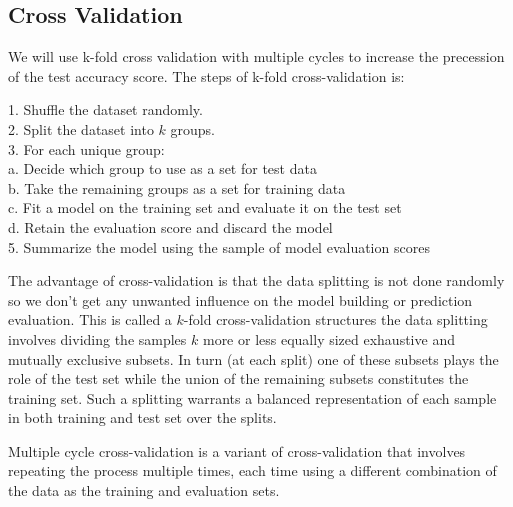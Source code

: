 \subsection{Cross Validation}
We will use k-fold cross validation with multiple cycles to increase the
precession of the test accuracy score. 
The steps of k-fold cross-validation is:
\begin{mdframed}[backgroundcolor=black!10]
\raggedright

1. Shuffle the dataset randomly.\\

2. Split the dataset into $k$ groups.\\

3. For each unique group:\\

\hspace{1cm}a. Decide which group to use as a set for test data\\

\hspace{1cm}b. Take the remaining groups as a set for training data\\

\hspace{1cm}c. Fit a model on the training set and evaluate it on the test set\\

\hspace{1cm}d. Retain the evaluation score and discard the model\\

5. Summarize the model using the sample of model evaluation scores\\

\end{mdframed}

The advantage of cross-validation is that the data splitting is not done
randomly so we don't get any unwanted influence on the model building or
prediction evaluation. This is called a  $k$-fold cross-validation structures
the data splitting involves dividing the samples $k$ more or less equally sized
exhaustive and mutually exclusive subsets. In turn (at each split) one of these
subsets plays the role of the test set while the union of the remaining subsets
constitutes the training set. Such a splitting warrants a balanced
representation of each sample in both training and test set over the splits. 

Multiple cycle cross-validation is a variant of cross-validation that involves
repeating the process multiple times, each time using a different combination
of the data as the training and evaluation sets. 

